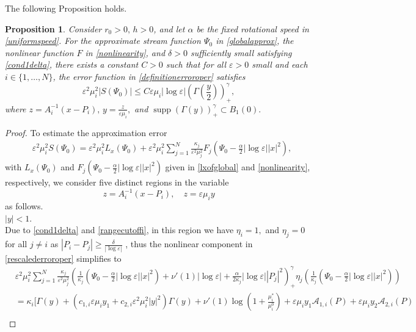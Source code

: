 \documentclass[11pt,reqno,a4paper]{amsart}
\numberwithin{equation}{section}
\newcommand{\ve}{\varepsilon}
\newtheorem{prop}{Proposition}[section]
\begin{document}
The following Proposition holds.
\begin{prop}\label{errorprop1}
    Consider $r_0>0,\, h>0$, and let $\alpha$ be the fixed rotational speed in \eqref{uniformspeed}. For the approximate stream function $\Psi_{0}$ in \eqref{globalapprox}, the nonlinear function $F$ in \eqref{nonlinearity}, and $\delta>0$ sufficiently small satisfying \eqref{cond1delta}, there exists a constant $C>0$ such that for all $\ve >0$ small and each $i\in\{1,\dots,N\}$, the error function in \eqref{definitionerroroper} satisfies
    \[\ve^2\mu_i^2\left| S\left(\Psi_{0}\right)\right|\leq C\ve\mu_i|\log\ve|\left(\Gamma\left(\frac{y}{2}\right)\right)^{\gamma}_{+},\]
where $z=A_i^{-1}(x-P_i), \,y=\frac{z}{\ve\mu_i},$ and $\operatorname{supp} \left(\Gamma(y)\right)^{\gamma}_{+} \subset B_1 (0).$
\end{prop}
\begin{proof}
To estimate the approximation error 
\begin{equation}\label{rescalederroroper}
\begin{aligned}
    &\ve^2\mu_i^2 S(\Psi_{0})=\ve^2\mu_i^2 L_{x}(\Psi_{0})+\ve^2\mu_i^2\sum_{j=1}^{N}\frac{\kappa_j}{\ve^2\mu_j^2}F_{j}\left(\Psi_0-\frac{\alpha}{2}|\log\ve||x|^2\right),
\end{aligned}
\end{equation}
with $L_x(\Psi_0)$ and $F_j\left(\Psi_0-\frac{\alpha}{2}|\log\ve||x|^2\right)$ given in \eqref{lxofglobal} and \eqref{nonlinearity}, respectively, we consider five distinct regions in the variable  \[z=A_i^{-1}(x-P_i),\quad z=\ve\mu_i y\] as follows.
\\
 $|y|< 1.$
\\
Due to \eqref{cond1delta} and \eqref{rangecutoffi}, in this region we have $\eta_{i}=1,$ and
$\eta_j=0$ for all $j\neq i$ as $|P_i-P_j|\geq \frac{\delta}{|\log\ve|}$ , thus the nonlinear component in \eqref{rescalederroroper} simplifies to 
\begin{equation}\label{approxerrfirst}
\begin{aligned}
&\ve^2\mu_i^2\sum_{j=1}^{N}\frac{\kappa_j}{\ve^2\mu_j^2}\left(\frac{1}{\kappa_j}\left(\Psi_0-\frac{\alpha}{2}|\log\ve||x|^2\right)+\nu'(1)|\log\ve|+\frac{\alpha}{2\kappa_j}|\log\ve||P_j|^2\right)^{\gamma}_{+}\eta_{j}\left(\frac{1}{\kappa_j}\left(\Psi_0-\frac{\alpha}{2}|\log\ve||x|^2\right)\right)\\
&=\kappa_i\Bigg[\Gamma(y)+(c_{1,i}\ve\mu_iy_1+c_{2,i}\ve^2\mu_i^2|y|^2)\Gamma(y)+\nu'(1)\log\left(1+\frac{\mu^{*}_i}{\mu^{0}_i}\right)+\ve\mu_i y_1\mathcal{A}_{1,i}(P)+\ve\mu_i y_2\mathcal{A}_{2,i}(P)\\

\end{aligned}
\end{equation}
\end{proof}
\end{document}
